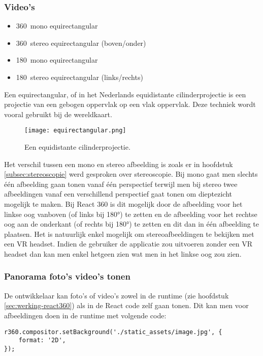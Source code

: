 \subsubsection{Video's}
\begin{itemize}
	\item 360\textdegree\ mono equirectangular
	\item 360\textdegree\ stereo equirectangular (boven/onder)
	\item 180\textdegree\ mono equirectangular
	\item 180\textdegree\ stereo equirectangular (links/rechts)
\end{itemize}

Een equirectangular, of in het Nederlands equidistante cilinderprojectie is een projectie van een gebogen oppervlak op een vlak oppervlak. Deze techniek wordt vooral gebruikt bij de wereldkaart.

\begin{figure}
	\centering
	\texttt{[image: equirectangular.png]}
	\caption{Een equidistante cilinderprojectie.}
	\label{fig:eq-cilinder}
\end{figure}

Het verschil tussen een mono en stereo afbeelding is zoals er in hoofdstuk \ref{subsec:stereoscopie} werd gesproken over stereoscopie. Bij mono gaat men slechts één afbeelding gaan tonen vanaf één perspectief terwijl men bij stereo twee afbeeldingen vanaf een verschillend perspectief gaat tonen om dieptezicht mogelijk te maken. Bij React 360 is dit mogelijk door de afbeelding voor het linkse oog vanboven (of links bij 180°) te zetten en de afbeelding voor het rechtse oog aan de onderkant (of rechts bij 180°) te zetten en dit dan in één afbeelding te plaatsen. Het is natuurlijk enkel mogelijk om stereoafbeeldingen te bekijken met een VR headset. Indien de gebruiker de applicatie zou uitvoeren zonder een VR headset dan kan men enkel hetgeen zien wat men in het linkse oog zou zien.

\subsubsection{Panorama foto's video's tonen}
De ontwikkelaar kan foto's of video's zowel in de runtime (zie hoofdstuk \ref{sec:werking-react360}) als in de React code zelf gaan tonen. Dit kan men voor afbeeldingen doen in de runtime met volgende code:

\begin{lstlisting}[frame=single, caption=Een afbeelding als achtergrond instellen in de runtime.]
r360.compositor.setBackground('./static_assets/image.jpg', {
	format: '2D',
});
\end{lstlisting}

